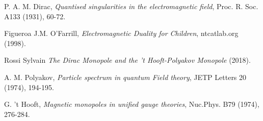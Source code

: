 \documentclass[main.tex]{subfiles}
\begin{document}
\clearpage
{}
{}


\begin{thebibliography}{99}


P. A. M. Dirac,
\emph{Quantised singularities in the electromagnetic field}, Proc. R. Soc. A133 (1931), 60-72.

Figueroa J.M. O'Farrill, \emph{Electromagnetic Duality for Children}, ntcatlab.org
(1998).

Rossi Sylvain \emph{The Dirac Monopole and the 't Hooft-Polyakov Monopole}  (2018).

A. M. Polyakov, \emph{Particle spectrum in quantum Field theory}, JETP Letters 20 (1974), 194-195.

G. 't Hooft, \emph{Magnetic monopoles in unified gauge theories}, Nuc.Phys. B79 (1974), 276-284.



\end{thebibliography}
\end{document}
